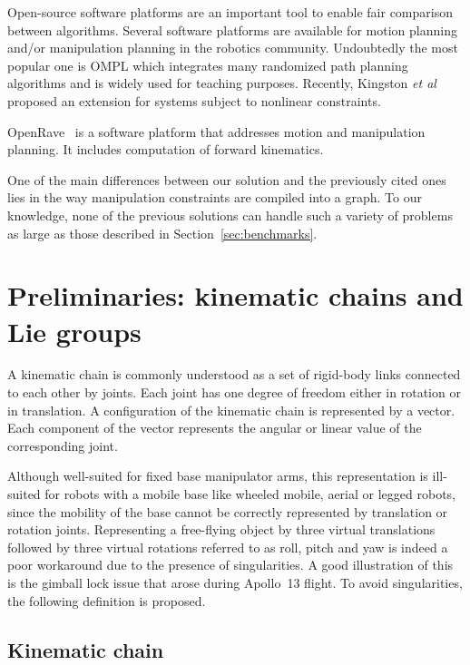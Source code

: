 Open-source software platforms are an important tool to enable fair
comparison between algorithms.
Several software platforms are available for motion planning and/or manipulation
planning in the robotics community. Undoubtedly the most popular one is OMPL \cite{ompl2012} which integrates many randomized path planning algorithms and is widely used for teaching purposes. Recently, {\color{blue}Kingston \textit{et al}}~\cite{KinMolKav2019} proposed an extension for systems subject to nonlinear constraints.

OpenRave~\cite{diankov_thesis} is
a software platform that addresses motion and manipulation planning. It includes
computation of forward kinematics.

One of the main differences between our solution and the previously cited ones lies in the way manipulation constraints are compiled into a graph. To our knowledge, none of the previous solutions can handle such a variety of problems as large as those described in Section~\ref{sec:benchmarks}.

\section{Preliminaries: kinematic chains and Lie groups}\label{partie:preliminary}

A kinematic chain is commonly understood as a set of rigid-body links connected
to each other by joints. Each joint has one degree of freedom either in
rotation or in translation. A configuration of the kinematic chain is represented by a vector. Each component of the vector represents the angular or linear value of the corresponding joint.

Although well-suited for fixed base manipulator
arms, this representation is ill-suited for robots with a mobile base like wheeled
mobile, aerial or legged robots, since the mobility of the base
cannot be correctly represented by translation or rotation joints.
Representing a free-flying object by three virtual translations followed by
three virtual rotations referred to as roll, pitch and yaw is indeed a poor workaround
due to the presence of singularities. A good illustration of this is the gimball
lock issue that arose during Apollo~13 flight. To avoid singularities, the following definition is proposed.

\subsection{Kinematic chain}

